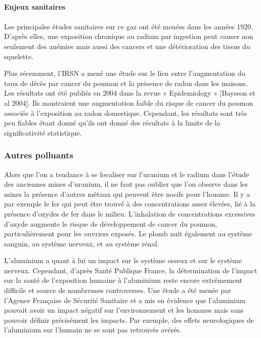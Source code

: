 \documentclass{article}
\begin{document}
\paragraph{Enjeux sanitaires}

\paragraph{}Les principales études sanitaires sur ce gaz ont été menées dans les années 1920. D’après elles, une exposition chronique au radium par ingestion peut causer non seulement des anémies mais aussi des cancers et une détérioration des tissus du squelette.

Plus récemment, l’IRSN a mené une étude sur le lien entre l’augmentation du taux de décès par cancer du poumon et la présence de radon dans les maisons. Les résultats ont été publiés en 2004 dans la revue « Epidemiology » [Baysson et al 2004]. Ils montraient une augmentation faible du risque de cancer du poumon associée à l’exposition au radon  domestique. Cependant, les résultats sont très peu fiables étant donné qu’ils ont donné des résultats à la limite de la significativité statistique.

\subsubsection{Autres polluants}

Alors que l’on a tendance à se focaliser sur l’uranium et le radium dans l’étude des anciennes mines d’uranium, il ne faut pas oublier que l’on observe dans les mines la présence d'autres métaux qui peuvent être nocifs pour l’homme. Il y a par exemple le fer qui peut être trouvé à des concentrations assez élevées, lié à la présence d'oxydes de fer dans le milieu. L'inhalation de concentrations excessives d'oxyde augmente le risque de développement de cancer du poumon, particulièrement pour les ouvriers exposés. Le plomb nuit également au système sanguin, au système nerveux, et au système rénal.

L’aluminium a quant à lui un impact sur le système osseux et sur le système nerveux. Cependant, d’après Santé Publique France, la détermination de l'impact sur la santé de l'exposition humaine à l'aluminium reste encore extrêmement difficile et source de nombreuses controverses. Une étude a été menée par l’Agence Française de Sécurité Sanitaire et a mis en évidence que l’aluminium pouvait avoir un impact négatif sur l’environnement et les hommes mais sans pouvoir définir précisément les impacts.  Par exemple, des effets neurologiques de l’aluminium sur l’humain ne se sont pas retrouvés avérés.
\end{document}
